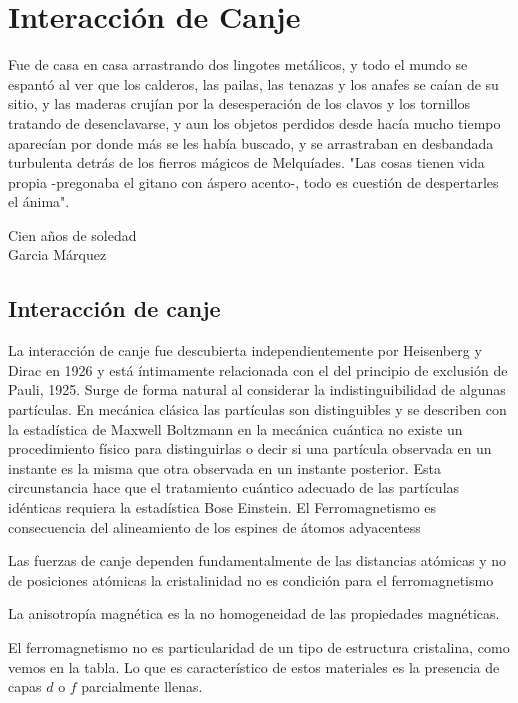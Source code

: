 \chapter{Interacción de Canje} %

\begin{center}

Fue de casa en casa arrastrando dos lingotes metálicos, y todo el mundo se
espantó al ver que los calderos, las pailas, las tenazas y los anafes se caían de su sitio, y las maderas crujían por la desesperación de los clavos y los tornillos tratando de desenclavarse, y aun los objetos perdidos desde hacía mucho tiempo aparecían por donde más se les había buscado, y se arrastraban en desbandada turbulenta detrás de los fierros mágicos de Melquíades. "Las cosas tienen vida propia -pregonaba el gitano con áspero acento-, todo es cuestión de despertarles el ánima".

\hspace{3.6cm} Cien años de soledad\\
\hspace{4.6cm} Garcia Márquez

\end{center}


\section{Interacción de canje}


La interacción de canje fue descubierta independientemente por Heisenberg y Dirac en 1926 y está íntimamente relacionada con el del principio de exclusión de Pauli, 1925. Surge de forma natural al considerar la indistinguibilidad de algunas partículas. En mecánica clásica las partículas son distinguibles y se describen con la estadística de Maxwell Boltzmann en la mecánica cuántica no existe un procedimiento físico para distinguirlas o decir si una partícula observada en un instante es la misma que otra observada en un instante posterior. Esta circunstancia hace que el tratamiento cuántico adecuado de las partículas idénticas requiera la estadística Bose Einstein. El Ferromagnetismo es consecuencia del alineamiento de los espines de átomos adyacentess

Las fuerzas de canje dependen fundamentalmente de las distancias atómicas y no de posiciones atómicas la cristalinidad no es condición para el ferromagnetismo

La anisotropía magnética es la no homogeneidad de las propiedades magnéticas.

El ferromagnetismo no es particularidad de un tipo de estructura cristalina,
como vemos en la tabla. Lo que es característico de estos materiales es la presencia de capas $d$ o $f$ parcialmente llenas.